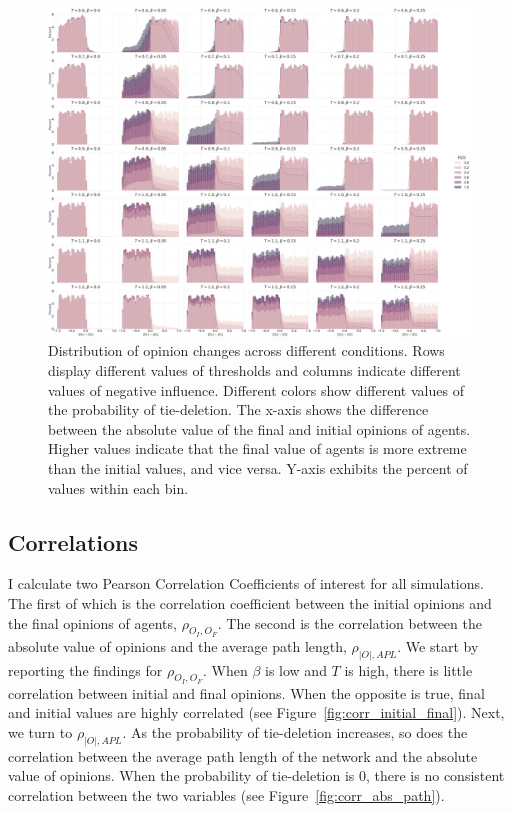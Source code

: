 \documentclass{article}
\begin{document}
\begin{figure}[H]
    \centering
    \includegraphics[width=.9\linewidth]{../plots/overall/Radicalization.png}
  \caption{Distribution of opinion changes across different conditions. Rows display different values of thresholds and columns indicate different values of negative influence. Different colors show different values of the probability of tie-deletion. The x-axis shows the difference between the absolute value of the final and initial opinions of agents. Higher values indicate that the final value of agents is more extreme than the initial values, and vice versa. Y-axis exhibits the percent of values within each bin. }
  \label{fig:radicalization}
\end{figure}

\subsection{Correlations}

I calculate two Pearson Correlation Coefficients of interest for all simulations. The first of which is the correlation coefficient between the initial opinions and the final opinions of agents, $\rho_{O_I, O_F}$. The second is the correlation between the absolute value of opinions and the average path length, $\rho_{|O|, APL}$.
We start by reporting the findings for $\rho_{O_I, O_F}$. When $\beta$ is low and $T$ is high, there is little correlation between initial and final opinions. When the opposite is true, final and initial values are highly correlated (see Figure~\ref{fig:corr_initial_final}). 
Next, we turn to $\rho_{|O|, APL}$. As the probability of tie-deletion increases, so does the correlation between the average path length of the network and the absolute value of opinions. When the probability of tie-deletion is 0, there is no consistent correlation between the two variables (see Figure~\ref{fig:corr_abs_path}). 
\end{document}

